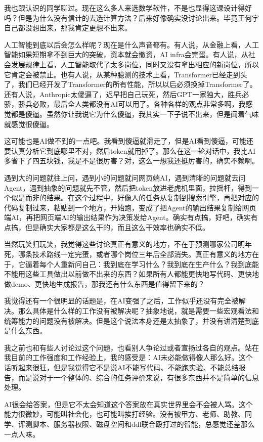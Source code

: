 我也跟认识的同学聊过。现在这么多人来选数学软件，不是也显得这课设计得好吗？但是为什么没有信计的去选计算方法？后来好像确实没讨论出来。毕竟王何宇自己都没想出来，那我肯定更想不出来。

人工智能到底以后会怎么样呢？现在是什么声音都有。有人说，从金融上看，人工智能如果短期拿不到巨大的突破，资本就会撤资，AI infra会完蛋。有人说，从社会发展规律上看，人工智能取代了太多岗位，同时又没有拿出相应的新岗位，所以它肯定会被禁止。也有人说，从某种臆测的技术上看，Transformer已经走到头了，我们已经开发了Transformer的所有性能，所以以后必须换掉Transformer了。还有人说，Anthropic太傻逼了，迟早把自己玩死，然后GPT一家独大，胜兵必骄，骄兵必败，最后全人类都没有AI可以用了。各种各样的观点非常多啊，我感觉都是傻逼。虽然你让我说它为什么傻逼，我其实一下子说不出来，但是闻着气味就感觉很傻逼。

这可能也是AI做不到的一点吧。我看到傻逼就滑走了，但是AI看到傻逼，可能还要认真分析它到底哪里不对，然后token就用掉了。那么在这一轮对话中，我比AI多省下了四五块钱，我是不是很厉害？对，这么一想我还挺厉害的，确实不赖啊。

遇到大的问题就往上问，遇到小的问题就问网页端AI，遇到清晰的问题就去问Agent，遇到抽象的问题就先不管，然后把token放进老虎机里面，拉摇杆，得到一个似是而非的结果。在这个过程中，好像人的任务从复制到搜索引擎，再把对应的代码复制过来，粘贴到一个地方，开始跑，变成了把Agent的输出结果复制给网页端AI，再把网页端AI的输出结果作为决策发给Agent。确实有点搞，好吧，确实有点搞，但是确实大家都是这么干的，而且这么干效率也确实不低。

当然玩笑归玩笑，我觉得这些讨论真正有意义的地方，不在于预测哪家公司明年死，哪条技术路线一定完蛋，或者哪个岗位三年后全部消失。真正有意义的地方在于，它逼着每个人重新问自己：我到底在学习什么？我到底在生产什么？我到底能不能用这些工具做出以前做不出来的东西？如果所有人都能更快地写代码、更快地做demo、更快地生成报告，那我还有什么东西是值得留下来的？

我觉得还有一个很明显的话题是，在AI变强了之后，工作似乎还没有完全被解决。那么具体是什么样的工作没有被解决呢？抽象地说，就是需要一些宏观看法和统筹能力的问题没有被解决。但是这个说法本身还是太抽象了，并没有讲清楚到底是什么东西。

我之前也和有些人讨论过这个问题，也看别人争论过或者宣扬过各自的观点。站在我目前的工作强度和工作经验上，我的感受是：AI未必能做得像人那么好。这个话听起来很狂，但是我觉得它不是说AI不能写代码、不能跑实验、不能总结报告，而是说对于一个整体的、综合的任务评价来说，有很多东西并不是简单的信息处理。

AI很会给答案，但是它不太会知道这个答案放在真实世界里会不会被人骂。这个能力很微妙，可能叫社会化，也可能叫挨打经验。没有被甲方、老师、助教、同学、评测脚本、服务器权限、磁盘空间和ddl联合殴打过的智能，总感觉还差那么一点人味。


